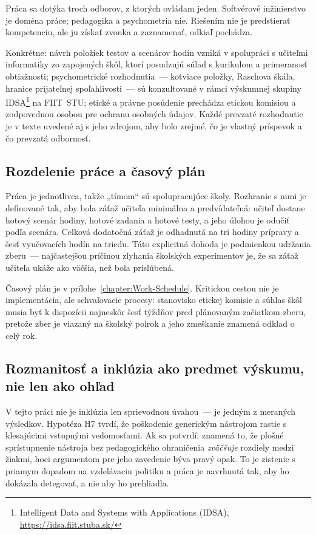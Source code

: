 Práca sa dotýka troch odborov, z ktorých ovládam jeden. Softvérové inžinierstvo je doména práce; pedagogika a psychometria nie. Riešením nie je predstierať kompetenciu, ale ju získať zvonka a zaznamenať, odkiaľ pochádza.

Konkrétne: návrh položiek testov a scenárov hodín vzniká v spolupráci s učiteľmi informatiky zo zapojených škôl, ktorí posudzujú súlad s kurikulom a primeranosť obtiažnosti; psychometrické rozhodnutia~--- kotviace položky, Raschova škála, hranice prijateľnej spoľahlivosti~--- sú konzultované v rámci výskumnej skupiny IDSA\footnote{Intelligent Data and Systems with Applications (IDSA), \url{https://idsa.fiit.stuba.sk/}} na FIIT~STU; etické a právne posúdenie prechádza etickou komisiou a zodpovednou osobou pre ochranu osobných údajov. Každé prevzaté rozhodnutie je v texte uvedené aj s jeho zdrojom, aby bolo zrejmé, čo je vlastný príspevok a čo prevzatá odbornosť.

\subsection{Rozdelenie práce a časový plán}

Práca je jednotlivca, takže „tímom“ sú spolupracujúce školy. Rozhranie s nimi je definované tak, aby bola záťaž učiteľa minimálna a predvídateľná: učiteľ dostane hotový scenár hodiny, hotové zadania a hotové testy, a jeho úlohou je odučiť podľa scenára. Celková dodatočná záťaž je odhadnutá na tri hodiny prípravy a šesť vyučovacích hodín na triedu. Táto explicitná dohoda je podmienkou udržania zberu~--- najčastejšou príčinou zlyhania školských experimentov je, že sa záťaž učiteľa ukáže ako väčšia, než bola prisľúbená.

Časový plán je v prílohe~\ref{chapter:Work-Schedule}. Kritickou cestou nie je implementácia, ale schvaľovacie procesy: stanovisko etickej komisie a súhlas škôl musia byť k dispozícii najneskôr šesť týždňov pred plánovaným začiatkom zberu, pretože zber je viazaný na školský polrok a jeho zmeškanie znamená odklad o celý rok.

\subsection{Rozmanitosť a inklúzia ako predmet výskumu, nie len ako ohľad}

V tejto práci nie je inklúzia len sprievodnou úvahou~--- je jedným z meraných výsledkov. Hypotéza H7 tvrdí, že poškodenie generickým nástrojom rastie s klesajúcimi vstupnými vedomosťami. Ak sa potvrdí, znamená to, že plošné sprístupnenie nástroja bez pedagogického ohraničenia \emph{zväčšuje} rozdiely medzi žiakmi, hoci argumentom pre jeho zavedenie býva pravý opak. To je zistenie s priamym dopadom na vzdelávaciu politiku a práca je navrhnutá tak, aby ho dokázala detegovať, a nie aby ho prehliadla.

